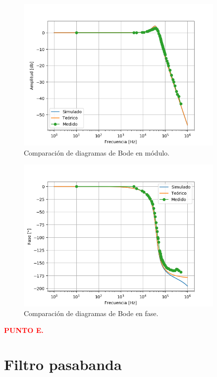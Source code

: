 \begin{figure}[H]
	\centering
	\includegraphics[width=0.9\textwidth]{Ejercicio2/Mediciones/Modulo.png}
\caption{Comparación de diagramas de Bode en módulo.}
	\label{fig:bodemod}
\end{figure}
\begin{figure}[H]
	\centering
	\includegraphics[width=0.9\textwidth]{Ejercicio2/Mediciones/Fase.png}
\caption{Comparación de diagramas de Bode en fase.}
	\label{fig:bodefase}
\end{figure}

\begin{center}
	\textcolor{red}{\textbf{PUNTO E.}}
\end{center}

\section{Filtro pasabanda}

